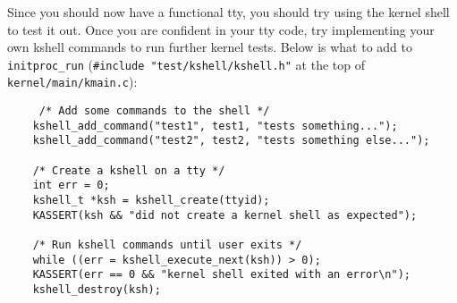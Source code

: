 Since you should now have a functional tty, you should try using the kernel shell to test it out. Once you are confident in your tty code, try implementing your own kshell commands to run further kernel tests. Below is what to add to \texttt{initproc\_run} (\texttt{\#include "test/kshell/kshell.h"} at the top of \texttt{kernel/main/kmain.c}):
\begin{verbatim}
     /* Add some commands to the shell */
    kshell_add_command("test1", test1, "tests something...");
    kshell_add_command("test2", test2, "tests something else...");
 
    /* Create a kshell on a tty */
    int err = 0;
    kshell_t *ksh = kshell_create(ttyid);
    KASSERT(ksh && "did not create a kernel shell as expected");
 
    /* Run kshell commands until user exits */
    while ((err = kshell_execute_next(ksh)) > 0);
    KASSERT(err == 0 && "kernel shell exited with an error\n");
    kshell_destroy(ksh);
\end{verbatim}
